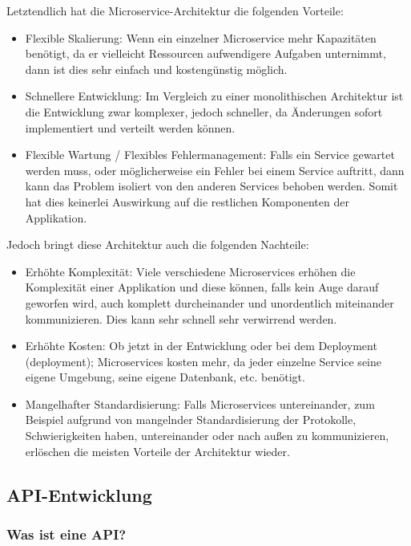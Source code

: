 Letztendlich hat die Microservice-Architektur die folgenden Vorteile:

\begin{itemize}
    \item Flexible Skalierung: Wenn ein einzelner Microservice mehr Kapazitäten benötigt, da er vielleicht Ressourcen aufwendigere Aufgaben unternimmt, dann ist dies sehr einfach und kostengünstig möglich.
    \item Schnellere Entwicklung: Im Vergleich zu einer monolithischen Architektur ist die Entwicklung zwar komplexer, jedoch schneller, da Änderungen sofort implementiert und verteilt werden können.
    \item Flexible Wartung / Flexibles Fehlermanagement: Falls ein Service gewartet werden muss, oder möglicherweise ein Fehler bei einem Service auftritt, dann kann das Problem isoliert von den anderen Services behoben werden. Somit hat dies keinerlei Auswirkung auf die restlichen Komponenten der Applikation.
\end{itemize}

Jedoch bringt diese Architektur auch die folgenden Nachteile:

\begin{itemize}
    \item Erhöhte Komplexität: Viele verschiedene Microservices erhöhen die Komplexität einer Applikation und diese können, falls kein Auge darauf geworfen wird, auch komplett durcheinander und unordentlich miteinander kommunizieren. Dies kann sehr schnell sehr verwirrend werden.
    \item Erhöhte Kosten: Ob jetzt in der Entwicklung oder bei dem Deployment (\gls{deployment}); Microservices kosten mehr, da jeder einzelne Service seine eigene Umgebung, seine eigene Datenbank, etc. benötigt.
    \item Mangelhafter Standardisierung: Falls Microservices untereinander, zum Beispiel aufgrund von mangelnder Standardisierung der Protokolle, Schwierigkeiten haben, untereinander oder nach außen zu kommunizieren, erlöschen die meisten Vorteile der Architektur wieder.
\end{itemize}

\subsection{API-Entwicklung}

\subsubsection{Was ist eine API?}

